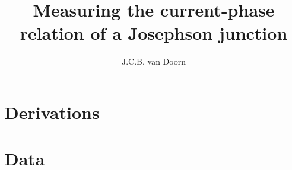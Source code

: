 \documentclass[twoside,single]{lion-msc}
\title{Measuring the current-phase relation of a Josephson junction}
\author{J.C.B. van Doorn}
\begin{document}
	\maketitle

	\tableofcontents

	
	
	
	
	
	

	\appendix
	\chapter{Derivations}
	
	\chapter{Data}
	

	\printbibliography
\end{document}
